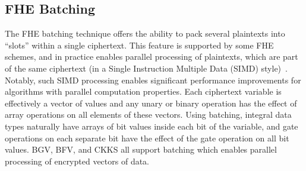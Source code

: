 


\subsection{FHE Batching}
The FHE batching technique offers the ability to pack several plaintexts into ``slots'' within a single ciphertext. This feature is supported by some FHE schemes, and in practice  enables parallel processing of plaintexts, which are part of the same ciphertext (in a Single Instruction Multiple Data (SIMD) style)~\cite{batching}. Notably, such SIMD processing enables significant performance improvements for algorithms with parallel computation properties.
Each ciphertext variable is effectively a vector of values and any unary or binary operation has the effect of array operations on all elements of these vectors. Using batching, integral data types naturally have arrays of bit values inside each bit of the variable, and gate operations on each separate bit have the effect of the gate operation on all bit values.
BGV, BFV, and CKKS all support batching which enables parallel processing of encrypted vectors of data.

